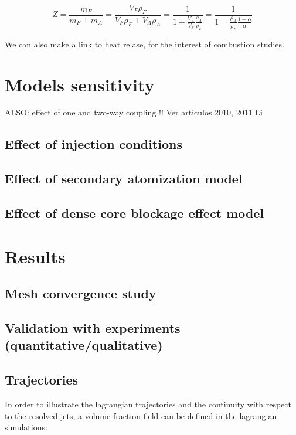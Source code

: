 \begin{equation}
Z = \frac{m_F}{m_F + m_A} = \frac{V_F \rho_F}{V_F \rho_F + V_A \rho_A} = \frac{1}{1 + \frac{V_A}{V_F} \frac{\rho_A}{\rho_F}} = \frac{1}{1 = \frac{\rho_A}{\rho_F} \frac{1 - \alpha}{\alpha}}
\end{equation}


We can also make a link to heat relase, for the interest of combustion studies.


\section{Models sensitivity}

ALSO: effect of one and two-way coupling !! Ver articulos 2010, 2011 Li 

\subsection{Effect of injection conditions}

\subsection{Effect of secondary atomization model}

\subsection{Effect of dense core blockage effect model}

\section{Results}

\subsection{Mesh convergence study}

\subsection{Validation with experiments (quantitative/qualitative)}

\subsection{Trajectories}

In order to illustrate the lagrangian trajectories and the continuity with respect to the resolved jets, a volume fraction field can be defined in the lagrangian simulations:

